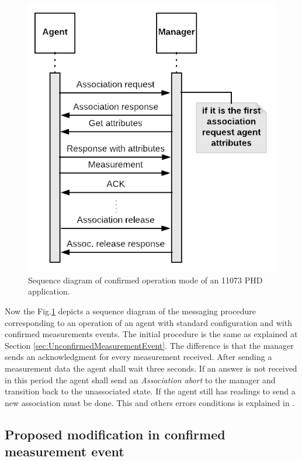 \begin{figure}[htbp]
\centerline{\includegraphics[scale=0.35]{figures/confirmed.png}}
\caption{Sequence diagram of confirmed operation mode of an 11073 PHD application.}
\label{fig:confirmedMode}
\end{figure}

Now the Fig.\ref{fig:confirmedMode} depicts a sequence diagram of the messaging procedure corresponding to an operation of an agent with standard configuration and with confirmed measurements events. The initial procedure is the same as explained at Section \ref{sec:UnconfirmedMeasurementEvent}. The difference is that the manager sends an acknowledgment for every measurement received. After sending a measurement data the agent shall wait three seconds. If an answer is not received in this period the agent shall send an \textit{Association abort} to the manager and transition back to the unassociated state. If the agent still has readings to send a new association must be done. This and others errors conditions is explained in \cite{b1}.

\subsection{Proposed modification in confirmed measurement event}

